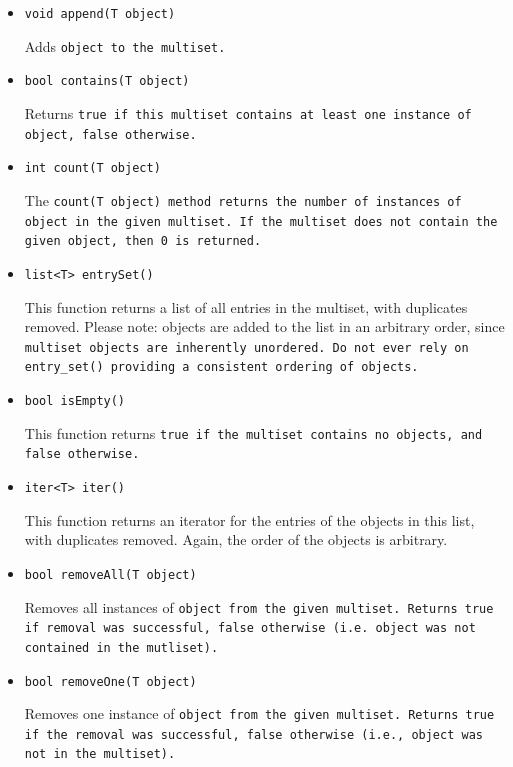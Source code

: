 \documentclass{article}
\begin{document}
\begin{itemize}

\item[] \tt void append(T object) \rm

Adds \tt object \rm to the \tt multiset\rm.

\item[] \tt bool contains(T object) \rm

Returns \tt true \rm if this \tt multiset \rm contains at least one instance of
\tt object\rm, \tt false \rm otherwise.

\item[] \tt int count(T object) \rm

The \tt count(T object) \rm method returns the number of instances of \tt object \rm
in the given \tt multiset\rm. If the \tt multiset \rm does not contain the given
object, then \tt 0 \rm is returned. 

\item[] \tt list<T> entrySet() \rm

This function returns a list of all entries in the multiset, with duplicates removed.
Please note: objects are added to the list in an arbitrary order, since \tt multiset
\rm objects are inherently unordered. Do not ever rely on \tt entry\_set() \rm 
providing a consistent ordering of objects.

\item[] \tt bool isEmpty() \rm

This function returns \tt true \rm if the \tt multiset \rm contains no objects, and
\tt false \rm otherwise.

\item[] \tt iter<T> iter() \rm

This function returns an iterator for the entries of the objects in this list,
with duplicates removed. Again, the order of the objects is arbitrary. 

\item[] \tt bool removeAll(T object) \rm

Removes all instances of \tt object \rm from the given \tt multiset\rm. Returns
\tt true \rm if removal was successful, \tt false \rm otherwise (i.e. \tt object \rm
was not contained in the \tt mutliset\rm).

\item[] \tt bool removeOne(T object) \rm

Removes one instance of \tt object \rm from the given \tt multiset\rm. Returns
\tt true \rm if the removal was successful, \tt false \rm otherwise (i.e.,
\tt object \rm was not in the \tt multiset\rm).

\end{itemize}
\end{document}
